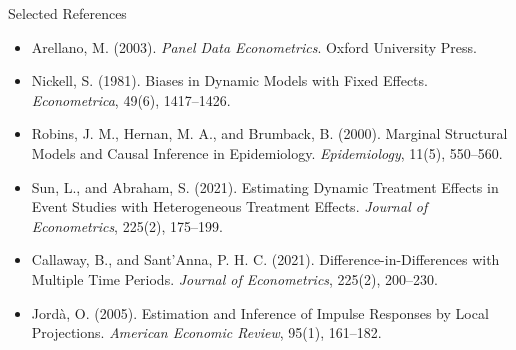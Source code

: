 \documentclass[aspectratio=169,11pt]{beamer}
\begin{document}
\begin{frame}{Selected References}
\small
\begin{itemize}
\item Arellano, M. (2003). \textit{Panel Data Econometrics}. Oxford University Press.
\item Nickell, S. (1981). Biases in Dynamic Models with Fixed Effects. \textit{Econometrica}, 49(6), 1417--1426.
\item Robins, J. M., Hernan, M. A., and Brumback, B. (2000). Marginal Structural Models and Causal Inference in Epidemiology. \textit{Epidemiology}, 11(5), 550--560.
\item Sun, L., and Abraham, S. (2021). Estimating Dynamic Treatment Effects in Event Studies with Heterogeneous Treatment Effects. \textit{Journal of Econometrics}, 225(2), 175--199.
\item Callaway, B., and Sant'Anna, P. H. C. (2021). Difference-in-Differences with Multiple Time Periods. \textit{Journal of Econometrics}, 225(2), 200--230.
\item Jordà, O. (2005). Estimation and Inference of Impulse Responses by Local Projections. \textit{American Economic Review}, 95(1), 161--182.
\end{itemize}
\end{frame}

\contactslide
\end{document}
